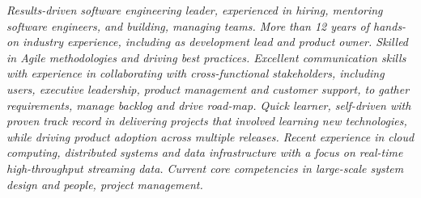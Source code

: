 {\selectfont
	\begin{justify}\textit{Results-driven software engineering leader, experienced in hiring, mentoring software engineers, and building, managing teams. More than 12 years of hands-on industry experience, including as development lead and product owner. Skilled in Agile methodologies and driving best practices. Excellent communication skills with experience in collaborating with cross-functional stakeholders, including users, executive leadership, product management and customer support, to gather requirements, manage backlog and drive road-map. Quick learner, self-driven with proven track record in delivering projects that involved learning new technologies, while driving product adoption across multiple releases. Recent experience in cloud computing, distributed systems and data infrastructure with a focus on real-time high-throughput streaming data. Current core competencies in large-scale system design and people, project management.}\end{justify}
}